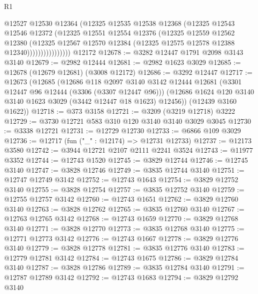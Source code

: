 \begin{lexlean}{R1}
\begin{coremodule}
                        @12527
                        @12530
                        @12364
                        (@12325
                          @12535
                          @12538
                          @12368
                          (@12325
                            @12543
                            @12546
                            @12372
                            (@12325
                              @12551
                              @12554
                              @12376
                              (@12325
                                @12559
                                @12562
                                @12380
                                (@12325
                                  @12567
                                  @12570
                                  @12384
                                  (@12325 @12575 @12578 @12388 @12340))))))))))))))))
    @12172
@12678 := @3282 @12447 @1791 @2098 @3143 @3140
@12679 := @2982 @12444
@12681 := @2982 @1623 @3029
@12685 := @12678 (@12679 @12681) (@3008 @12172)
@12686 := @3292 @12447
@12717 := @12673
    (@12685
      (@12686
        @118
        @2097
        @3140
        @3142
        @12444
        @12681
        (@3301 @12447 @96 @12444 (@3306 (@3307 @12447 @96)))
        (@12686 @1624 @120 @3140 @3140 @1623 @3029 (@3442 @12447 @18 @1623) @12456))
      (@12439 @3160 @1622))
@12718 := @373 @3158
@12721 := @3209 (@3219 @12718) @3222
@12729 := @3730 @12721 @583 @310 @120 @3140 @3140 @3029 @3045
@12730 := @3338 @12721
@12731 := @12729 @12730
@12733 := @6866 @109 @3029
@12736 := @12717 (fun ("_" : @12174) => @12731 @12733)
@12737 := @12173 @3580
@12742 := @3944 @12721 @2107 @2111 @2241 @3524
@12743 := @11977 @3352
@12744 := @12743 @1520
@12745 := @3829 @12744
@12746 := @12745 @3140
@12747 := @3828 @12746
@12749 := @3835 @12744 @3140
@12751 := @12747 @12749 @3142
@12752 := @12743 @1643
@12754 := @3829 @12752 @3140
@12755 := @3828 @12754
@12757 := @3835 @12752 @3140
@12759 := @12755 @12757 @3142
@12760 := @12743 @1651
@12762 := @3829 @12760 @3140
@12763 := @3828 @12762
@12765 := @3835 @12760 @3140
@12767 := @12763 @12765 @3142
@12768 := @12743 @1659
@12770 := @3829 @12768 @3140
@12771 := @3828 @12770
@12773 := @3835 @12768 @3140
@12775 := @12771 @12773 @3142
@12776 := @12743 @1667
@12778 := @3829 @12776 @3140
@12779 := @3828 @12778
@12781 := @3835 @12776 @3140
@12783 := @12779 @12781 @3142
@12784 := @12743 @1675
@12786 := @3829 @12784 @3140
@12787 := @3828 @12786
@12789 := @3835 @12784 @3140
@12791 := @12787 @12789 @3142
@12792 := @12743 @1683
@12794 := @3829 @12792 @3140

\end{coremodule}
\end{lexlean}
